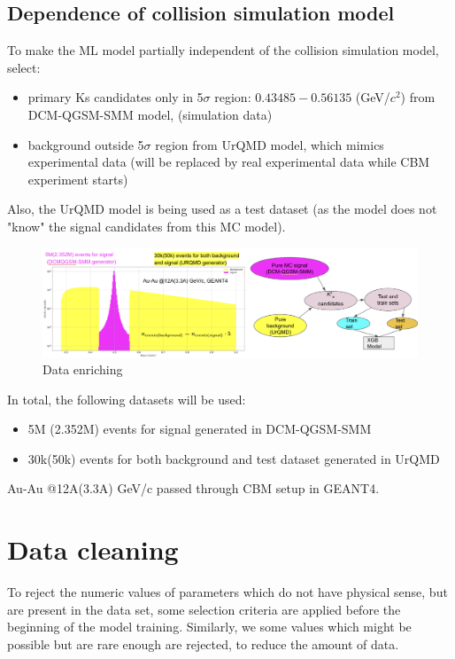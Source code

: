\documentclass[12pt,a4paper]{report}
\begin{document}
\subsection{Dependence of collision simulation model}
To make the ML model partially independent of the collision simulation model,  select:
\begin{itemize}
    \item primary Ks candidates only in 5$\sigma$ region: $0.43485 - 0.56135$ (GeV/$c^2$) from DCM-QGSM-SMM model\cite{dcm}\cite{dcm2}, (simulation data)
    \item background outside 5$\sigma$ region from UrQMD model\cite{urqmd}, which mimics experimental data (will be replaced by real experimental data while CBM experiment starts)
\end{itemize}
Also, the UrQMD model is being used as a test dataset (as the model does not "know" the signal candidates from this MC model).
\begin{figure}[H]
    \centering
    \includegraphics[width=1\textwidth]{images/dataset.png}
    \caption{Data enriching}
\end{figure}
In total, the following datasets will be used:
\begin{itemize}
    \item 5M (2.352M) events for signal generated in DCM-QGSM-SMM
    \item 30k(50k) events for both background and test dataset generated in UrQMD
\end{itemize}
Au-Au @12A(3.3A) GeV/c passed through CBM setup in GEANT4.\cite{geant4}\cite{geant4 2}
\section{Data cleaning}
To reject the numeric values of parameters which do not have physical sense, but are present in the data set, some selection criteria are applied before the beginning of the model training. Similarly, we some values which might be possible but are rare enough are rejected, to reduce the amount of data.
\end{document}
